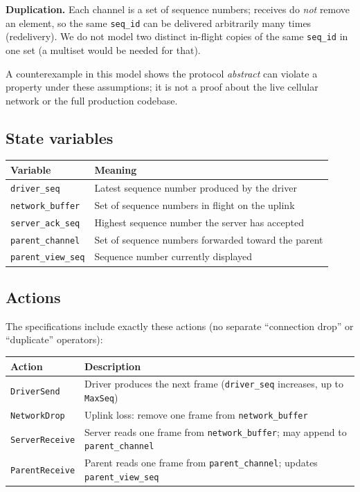 \documentclass[11pt,a4paper]{article}
\begin{document}
\textbf{Duplication.} Each channel is a set of sequence numbers; receives do \emph{not} remove an element, so the same \texttt{seq\_id} can be delivered arbitrarily many times (redelivery). We do not model two distinct in-flight copies of the same \texttt{seq\_id} in one set (a multiset would be needed for that).

A counterexample in this model shows the protocol \emph{abstract} can violate a property under these assumptions; it is not a proof about the live cellular network or the full production codebase.

\subsection{State variables}

\begin{center}
\begin{tabular}{@{}ll@{}}
\toprule
Variable & Meaning \\
\midrule
\texttt{driver\_seq} & Latest sequence number produced by the driver \\
\texttt{network\_buffer} & Set of sequence numbers in flight on the uplink \\
\texttt{server\_ack\_seq} & Highest sequence number the server has accepted \\
\texttt{parent\_channel} & Set of sequence numbers forwarded toward the parent \\
\texttt{parent\_view\_seq} & Sequence number currently displayed \\
\bottomrule
\end{tabular}
\end{center}

\subsection{Actions}

The specifications include exactly these actions (no separate ``connection drop'' or ``duplicate'' operators):

\begin{center}
\begin{tabular}{@{}l>{\raggedright\arraybackslash}p{}@{}}
\toprule
Action & Description \\
\midrule
\texttt{DriverSend} & Driver produces the next frame (\texttt{driver\_seq} increases, up to \texttt{MaxSeq}) \\
\texttt{NetworkDrop} & Uplink loss: remove one frame from \texttt{network\_buffer} \\
\texttt{ServerReceive} & Server reads one frame from \texttt{network\_buffer}; may append to \texttt{parent\_channel} \\
\texttt{ParentReceive} & Parent reads one frame from \texttt{parent\_channel}; updates \texttt{parent\_view\_seq} \\
\bottomrule
\end{tabular}
\end{center}
\end{document}
